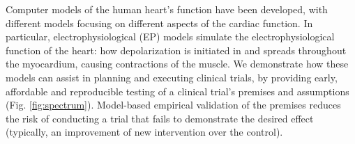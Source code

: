 Computer models of the human heart's function have been developed, with different models focusing on different aspects of the cardiac function.
In particular, electrophysiological (EP) models simulate the electrophysiological function of the heart: how depolarization is initiated in and spreads throughout the myocardium, causing contractions of the muscle.
We demonstrate how these models can assist in planning and executing clinical trials, by providing early, affordable and reproducible testing of a clinical trial's premises and assumptions (Fig. \ref{fig:spectrum}).
Model-based empirical validation of the premises reduces the risk of conducting a trial that fails to demonstrate the desired effect (typically, an improvement of new intervention over the control). 
